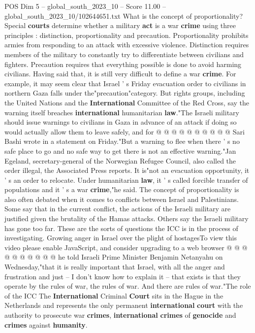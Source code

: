 \begin{textsample}{POS Dim 5 – global\_south\_2023\_10 – Score 11.00 – global\_south\_2023\_10/102644651.txt}
What is the concept of proportionality?
Special \textbf{courts} determine whether a military \textbf{act} is a war \textbf{crime} using three principles : distinction, proportionality and precaution.
Proportionality prohibits armies from responding to an attack with excessive violence.
Distinction requires members of the military to constantly try to differentiate between civilians and fighters.
Precaution requires that everything possible is done to avoid harming civilians.
Having said that, it is still very difficult to define a war \textbf{crime}.
For example, it may seem clear that Israel ' s Friday evacuation order to civilians in northern Gaza falls under the"precaution"category.
But rights groups, including the United Nations and the \textbf{International} Committee of the Red Cross, say the warning itself breaches \textbf{international} humanitarian \textbf{law}."The Israeli military should issue warnings to civilians in Gaza in advance of an attack if doing so would actually allow them to leave safely, and for @ @ @ @ @ @ @ @ @ @ Sari Bashi wrote in a statement on Friday."But a warning to flee when there ' s no safe place to go and no safe way to get there is not an effective warning."Jan Egeland, secretary-general of the Norwegian Refugee Council, also called the order illegal, the Associated Press reports.
It is"not an evacuation opportunity, it ' s an order to relocate.
Under humanitarian \textbf{law}, it ' s called forcible transfer of populations and it ' s a war \textbf{crime},"he said.
The concept of proportionality is also often debated when it comes to conflicts between Israel and Palestinians.
Some say that in the current conflict, the actions of the Israeli military are justified given the brutality of the Hamas attacks.
Others say the Israeli military has gone too far.
These are the sorts of questions the ICC is in the process of investigating.
Growing anger in Israel over the plight of hostagesTo view this video please enable JavaScript, and consider upgrading to a web browser @ @ @ @ @ @ @ @ @ @ he told Israeli Prime Minister Benjamin Netanyahu on Wednesday,"that it is really important that Israel, with all the anger and frustration and just -- I don't know how to explain it -- that exists is that they operate by the rules of war, the rules of war.
And there are rules of war."The role of the ICC The \textbf{International} Criminal \textbf{Court} sits in the Hague in the Netherlands and represents the only permanent \textbf{international} \textbf{court} with the authority to prosecute war \textbf{crimes}, \textbf{international} \textbf{crimes} of \textbf{genocide} and \textbf{crimes} against \textbf{humanity}.

\end{textsample}
